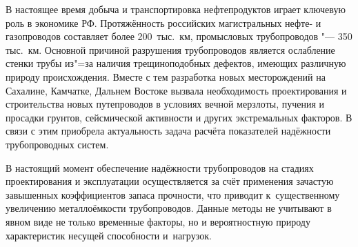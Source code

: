 

\date{20/VII/2012}

\maketitle


 В настоящее время добыча и транспортировка
нефтепродуктов играет ключевую роль в экономике РФ. Протяжённость
российских магистральных нефте- и газопроводов составляет более
200~тыс.~км, промысловых трубопроводов "--- 350 тыс.~км. Основной
причиной разрушения трубопроводов является ослабление стенки трубы
из"=за наличия трещиноподобных дефектов, имеющих различную природу
происхождения. Вместе с тем разработка новых месторождений на
Сахалине, Камчатке, Дальнем Востоке вызвала необходимость
проектирования и строительства новых путепроводов в условиях
вечной мерзлоты, пучения и просадки грунтов, сейсмической
активности и других экстремальных факторов. В связи с этим приобрела
актуальность задача расчёта показателей надёжности трубопроводных систем.

В настоящий момент обеспечение надёжности трубопроводов на стадиях проектирования и эксплуатации осуществляется за счёт применения зачастую завышенных коэффициентов запаса прочности, что приводит к~существенному увеличению металлоёмкости трубопроводов. 
Данные методы не учитывают в явном виде не только временные факторы, но и вероятностную природу характеристик несущей способности и~нагрузок.

